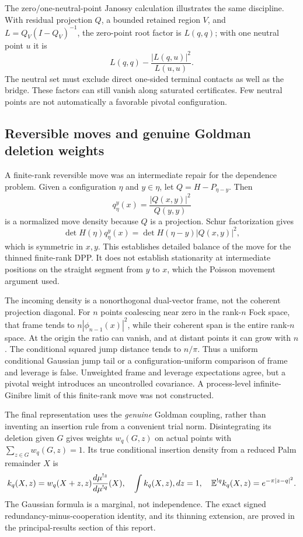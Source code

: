 \documentclass[11pt,a4paper]{article}
\theoremstyle{definition}
\theoremstyle{remark}
\numberwithin{equation}{section}
\begin{document}
The zero/one-neutral-point Janossy calculation illustrates the same
discipline.  With residual projection $Q$, a bounded retained region
$V$, and $L=Q_V(I-Q_V)^{-1}$, the zero-point root factor is $L(q,q)$;
with one neutral point $u$ it is
\[
 L(q,q)-\frac{|L(q,u)|^2}{L(u,u)}.
\]
The neutral set must exclude direct one-sided terminal contacts as well
as the bridge.  These factors can still vanish along saturated
certificates.  Few neutral points are not automatically a favorable
pivotal configuration.

\subsection{Reversible moves and genuine Goldman deletion weights}
\label{br:goldman}

A finite-rank reversible move was an intermediate repair for the
dependence problem.  Given a configuration $\eta$ and $y\in\eta$, let
$Q=H-P_{\eta-y}$.  Then
\[
 q_\eta^y(x)=\frac{|Q(x,y)|^2}{Q(y,y)}
\]
is a normalized move density because $Q$ is a projection.  Schur
factorization gives
\[
 \det H(\eta)q_\eta^y(x)
 =\det H(\eta-y)|Q(x,y)|^2,
\]
which is symmetric in $x,y$.  This establishes detailed balance of
the move for the thinned finite-rank DPP.  It does not establish
stationarity at intermediate positions on the straight segment from
$y$ to $x$, which the Poisson movement argument used.

The incoming density is a nonorthogonal dual-vector frame, not the
coherent projection diagonal.  For $n$ points coalescing near zero in
the rank-$n$ Fock space, that frame tends to
$n|\phi_{n-1}(x)|^2$, while their coherent span is the entire rank-$n$
space.  At the origin the ratio can vanish, and at distant points it
can grow with $n$.  The conditional squared jump distance tends to
$n/\pi$.  Thus a uniform conditional Gaussian jump tail or a
configuration-uniform comparison of frame and leverage is false.
Unweighted frame and leverage expectations agree, but a pivotal weight
introduces an uncontrolled covariance.  A process-level
infinite-Ginibre limit of this finite-rank move was not constructed.

The final representation uses the \emph{genuine} Goldman coupling,
rather than inventing an insertion rule from a convenient trial norm.
Disintegrating its deletion given $G$ gives weights $w_q(G,z)$ on actual
points with $\sum_{z\in G}w_q(G,z)=1$.  Its true conditional insertion
density from a reduced Palm remainder $X$ is
\[
 k_q(X,z)=w_q(X+z,z)\frac{d\mu^{!z}}{d\mu^{!q}}(X),
 \quad
 \int k_q(X,z)\\,dz=1,
 \quad
 \mathbb E^{!q}k_q(X,z)=e^{-\pi|z-q|^2}.
\]
The Gaussian formula is a marginal, not independence.  The exact
signed redundancy-minus-cooperation identity, and its thinning
extension, are proved in the principal-results section of this report.
\end{document}
